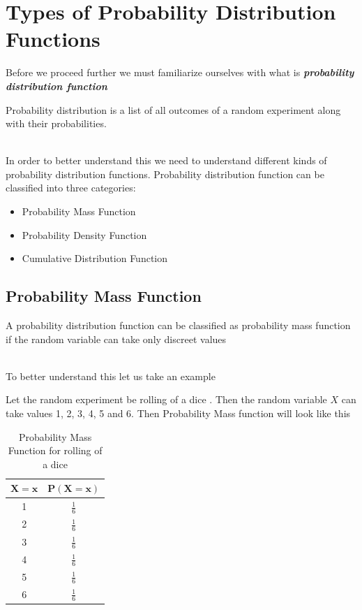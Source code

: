 \documentclass[twoside,12pt]{report}  %
\begin{document}
\section{Types of Probability Distribution Functions}
\noindent
Before we proceed further we must familiarize ourselves with what is \textbf{\textit{probability distribution function}}
\\
\begin{tcolorbox}[colback=red!5!white, colframe=red!75!black, title = \textbf{Probability Distribution Function}]
	Probability distribution is a list of all outcomes of a random experiment along with their probabilities.
\end{tcolorbox}
\noindent
\\
In order to better understand this we need to understand different kinds of probability distribution functions. Probability distribution function can be classified into three categories:
\begin{itemize}
	\item Probability Mass Function
	\item Probability Density Function
	\item Cumulative Distribution Function
\end{itemize}


\subsection{Probability Mass Function}
\begin{tcolorbox}[colback=red!5!white, colframe=red!75!black, title = \textbf{Probability Mass Function}]
	A probability distribution function can be classified as probability mass function if the random variable can take only discreet values 
\end{tcolorbox}
\noindent
\\
To better understand this let us take an example

\begin{tcolorbox}[colback=blue!5!white, colframe=blue!75!black, title = \textbf{Probability Mass Function}]
	Let the random experiment be rolling of a dice . Then the random variable  $X$ can take values 1, 2, 3, 4, 5 and 6. 
	Then Probability Mass function will look like this
	\begin{table}[H]
		\centering
		\begin{tabular}{c|c}
			$\boldsymbol{X=x}$ & $\boldsymbol{P(X=x)}$      \\
			\hline
			1     & $\frac{1}{6}$ \\
			2     & $\frac{1}{6}$ \\
			3     & $\frac{1}{6}$ \\
			4     & $\frac{1}{6}$ \\
			5     & $\frac{1}{6}$ \\
			6     & $\frac{1}{6}$
		\end{tabular}
		\caption{Probability Mass Function for rolling of a dice}
		\label{probability_mass_function_example}
	\end{table}
\end{tcolorbox}
\end{document}
